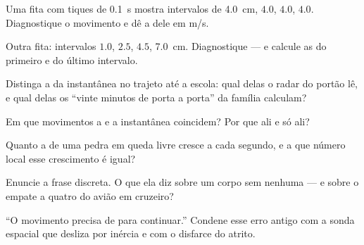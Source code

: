 \begin{exercise}[$\star$]\label{exo:g9:uniform-varied-motion:2}
Uma fita com tiques de \qty{0.1}{s} mostra intervalos de
\qty{4.0}{cm}, $4.0$, $4.0$, $4.0$. Diagnostique o movimento e dê a
 dele em \unit{m/s}.
\end{exercise}

\begin{exercise}[$\star$]\label{exo:g9:uniform-varied-motion:3}
Outra fita: intervalos $1.0$, $2.5$, $4.5$, \qty{7.0}{cm}.
Diagnostique --- e calcule as  do primeiro e do último
intervalo.
\end{exercise}

\begin{exercise}[$\star$]\label{exo:g9:uniform-varied-motion:4}
Distinga a  da instantânea no trajeto até a escola:
qual delas o radar do portão lê, e qual delas os ``vinte minutos de
porta a porta'' da família calculam?
\end{exercise}

\begin{exercise}[$\star$]\label{exo:g9:uniform-varied-motion:5}
Em que movimentos a  e a instantânea coincidem? Por
que ali e só ali?
\end{exercise}

\begin{exercise}[$\star$]\label{exo:g9:uniform-varied-motion:6}
Quanto a  de uma pedra em queda livre cresce a cada
segundo, e a que número local esse crescimento é igual?
\end{exercise}

\begin{exercise}[$\star$]\label{exo:g9:uniform-varied-motion:7}
Enuncie a frase discreta. O que ela diz sobre um corpo sem 
nenhuma --- e sobre o empate a quatro do avião em cruzeiro?
\end{exercise}

\begin{exercise}[$\star$]\label{exo:g9:uniform-varied-motion:8}
``O movimento precisa de  para continuar.'' Condene esse erro
antigo com a sonda espacial que desliza por inércia e com o disfarce
do atrito.
\end{exercise}

